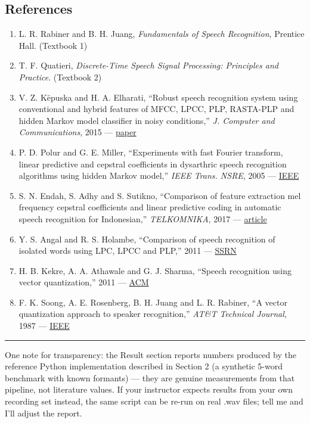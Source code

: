 \documentclass[
]{article}
\begin{document}
\subsection{References}\label{references}

\begin{enumerate}
\def\labelenumi{\arabic{enumi}.}
\item
  L. R. Rabiner and B. H. Juang, \emph{Fundamentals of Speech
  Recognition}, Prentice Hall. (Textbook 1)
\item
  T. F. Quatieri, \emph{Discrete-Time Speech Signal Processing:
  Principles and Practice}. (Textbook 2)
\item
  V. Z. Këpuska and H. A. Elharati, ``Robust speech recognition system
  using conventional and hybrid features of MFCC, LPCC, PLP, RASTA-PLP
  and hidden Markov model classifier in noisy conditions,'' \emph{J.
  Computer and Communications}, 2015 ---
  \href{https://www.academia.edu/download/95722310/PaperDownload.pdf}{paper}
\item
  P. D. Polur and G. E. Miller, ``Experiments with fast Fourier
  transform, linear predictive and cepstral coefficients in dysarthric
  speech recognition algorithms using hidden Markov model,'' \emph{IEEE
  Trans. NSRE}, 2005 ---
  \href{https://ieeexplore.ieee.org/abstract/document/1556613/}{IEEE}
\item
  S. N. Endah, S. Adhy and S. Sutikno, ``Comparison of feature
  extraction mel frequency cepstral coefficients and linear predictive
  coding in automatic speech recognition for Indonesian,''
  \emph{TELKOMNIKA}, 2017 ---
  \href{https://telkomnika.uad.ac.id/index.php/TELKOMNIKA/article/view/3605}{article}
\item
  Y. S. Angal and R. S. Holambe, ``Comparison of speech recognition of
  isolated words using LPC, LPCC and PLP,'' 2011 ---
  \href{https://papers.ssrn.com/sol3/papers.cfm?abstract_id=3527930}{SSRN}
\item
  H. B. Kekre, A. A. Athawale and G. J. Sharma, ``Speech recognition
  using vector quantization,'' 2011 ---
  \href{https://dl.acm.org/doi/abs/10.1145/1980022.1980107}{ACM}
\item
  F. K. Soong, A. E. Rosenberg, B. H. Juang and L. R. Rabiner, ``A
  vector quantization approach to speaker recognition,'' \emph{AT\&T
  Technical Journal}, 1987 ---
  \href{https://ieeexplore.ieee.org/abstract/document/6769208/}{IEEE}
\end{enumerate}

\begin{center}\rule{0.5\linewidth}{0.5pt}\end{center}

One note for transparency: the Result section reports numbers produced
by the reference Python implementation described in Section 2 (a
synthetic 5-word benchmark with known formants) --- they are genuine
measurements from that pipeline, not literature values. If your
instructor expects results from your own recording set instead, the same
script can be re-run on real .wav files; tell me and I'll adjust the
report.
\end{document}
